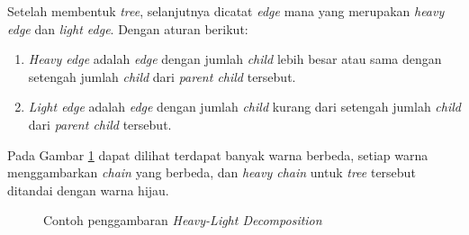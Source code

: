 \documentclass[a4paper]{IEEEtran}
\begin{document}
\quad Setelah membentuk \textit{tree}, selanjutnya dicatat \textit{edge} mana yang merupakan \textit{heavy edge} dan \textit{light edge}. Dengan aturan berikut:
\begin{enumerate}
\item \textit{Heavy edge} adalah \textit{edge} dengan jumlah \textit{child} lebih besar atau sama dengan setengah jumlah \textit{child} dari \textit{parent child} tersebut.
\item \textit{Light edge} adalah \textit{edge} dengan jumlah \textit{child} kurang dari setengah jumlah \textit{child} dari \textit{parent child} tersebut.
\end{enumerate}
\quad Pada Gambar \ref{fig:ht} dapat dilihat terdapat banyak warna berbeda, setiap warna menggambarkan \textit{chain} yang berbeda, dan \textit{heavy chain} untuk \textit{tree} tersebut ditandai dengan warna hijau.
\begin{figure}[H]
\centering
{}
		\caption{Contoh penggambaran \textit{Heavy-Light Decomposition}\label{fig:ht}}
		\end{figure}
\end{document}
